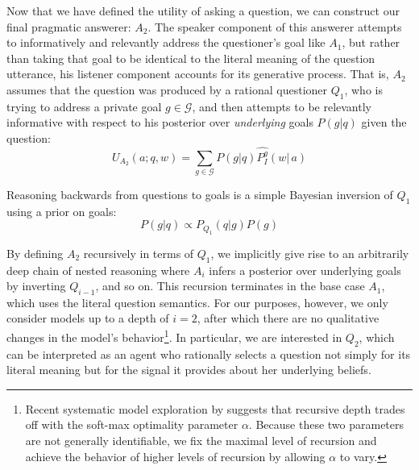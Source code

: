 \documentclass[12pt, floatsintext, jou]{apa6}
\begin{document}
Now that we have defined the utility of asking a question, we can construct our final pragmatic answerer: $A_2$. The speaker component of this answerer attempts to informatively and relevantly address the questioner's goal like $A_1$, but rather than taking that goal to be identical to the literal meaning of the question utterance, his listener component accounts for its generative process. That is, $A_2$ assumes that the question was produced by a rational questioner $Q_1$, who is trying to address a private goal $g \in \mathcal{G}$, and then attempts to be relevantly informative with respect to his posterior over \emph{underlying} goals $P(g|q)$ given the question:
$$U_{A_2}(a; q, w) = \sum_{g \in \mathcal{G}} P(g|q) \widehat{P^g_I}(w|\,a)$$

%
Reasoning backwards from questions to goals is a simple Bayesian inversion of $Q_1$ using a prior on goals:
$$
P(g|q) \propto P_{Q_1}(q|g)P(g)
$$

By defining $A_2$ recursively in terms of $Q_1$, we implicitly give rise to an arbitrarily deep chain of nested reasoning where $A_{i}$ infers a posterior over underlying goals by inverting $Q_{i-1}$, and so on. This recursion terminates in the base case $A_1$, which uses the literal question semantics. For our purposes, however, we only consider models up to a depth of $i=2$, after which there are no qualitative changes in the model's behavior\footnote{Recent systematic model exploration by  suggests that recursive depth trades off with the soft-max optimality parameter $\alpha$. Because these two parameters are not generally identifiable, we fix the maximal level of recursion and achieve the behavior of higher levels of recursion by allowing $\alpha$ to vary.}. In particular, we are interested in $Q_2$, which can be interpreted as an agent who rationally selects a question not simply for its literal meaning but for the signal it provides about her underlying beliefs. 

%
\end{document}
